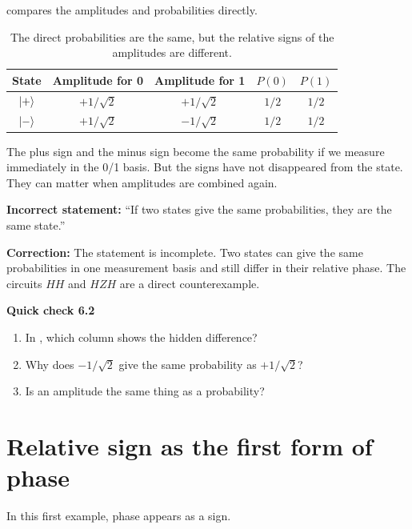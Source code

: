  compares the amplitudes and probabilities directly.

\begin{table}[t]
\centering
\begin{tabular}{ccccc}
\toprule
State & Amplitude for 0 & Amplitude for 1 & $P(0)$ & $P(1)$ \\
\midrule
$\lvert +\rangle$ & $+1/\sqrt{2}$ & $+1/\sqrt{2}$ & $1/2$ & $1/2$ \\
$\lvert -\rangle$ & $+1/\sqrt{2}$ & $-1/\sqrt{2}$ & $1/2$ & $1/2$ \\
\bottomrule
\end{tabular}
\caption{The direct probabilities are the same, but the relative signs of the amplitudes are different.}
\label{tab:ch06-amplitude-probability}
\end{table}

The plus sign and the minus sign become the same probability if we measure immediately in the 0/1 basis. But the signs have not disappeared from the state. They can matter when amplitudes are combined again.

\begin{misconception}
\textbf{Incorrect statement:} ``If two states give the same probabilities, they are the same state.''

\medskip
\textbf{Correction:} The statement is incomplete. Two states can give the same probabilities in one measurement basis and still differ in their relative phase. The circuits $H H$ and $H Z H$ are a direct counterexample.
\end{misconception}

\begin{checkpoint}
\textbf{Quick check 6.2}
\begin{enumerate}
  \item In , which column shows the hidden difference?
  \item Why does $-1/\sqrt{2}$ give the same probability as $+1/\sqrt{2}$?
  \item Is an amplitude the same thing as a probability?
\end{enumerate}
\end{checkpoint}

\section{Relative sign as the first form of phase}
\label{sec:ch06-relative-sign}

In this first example, phase appears as a sign.

